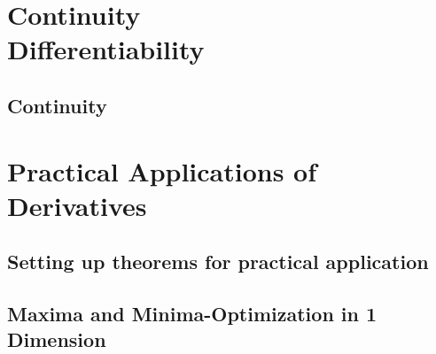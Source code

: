 \part{Continuity \\ Differentiability}

\chapter{Continuity}










\part{Practical Applications of Derivatives}

\chapter{Setting up theorems for practical application}







\chapter{Maxima and Minima-Optimization in 1 Dimension}



 








